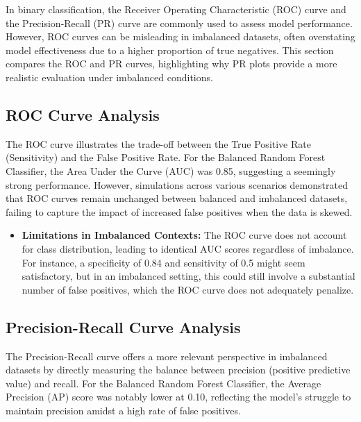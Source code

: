 \documentclass[12pt,a4paper]{report}
\begin{document}
In binary classification, the Receiver Operating Characteristic (ROC) curve and the Precision-Recall (PR) curve are commonly used to assess model performance. However, ROC curves can be misleading in imbalanced datasets, often overstating model effectiveness due to a higher proportion of true negatives. This section compares the ROC and PR curves, highlighting why PR plots provide a more realistic evaluation under imbalanced conditions.

\subsection{ROC Curve Analysis}

The ROC curve illustrates the trade-off between the True Positive Rate (Sensitivity) and the False Positive Rate. For the Balanced Random Forest Classifier, the Area Under the Curve (AUC) was 0.85, suggesting a seemingly strong performance. However, simulations across various scenarios demonstrated that ROC curves remain unchanged between balanced and imbalanced datasets, failing to capture the impact of increased false positives when the data is skewed\citep{classeval2024rocpr}.\\

\begin{itemize}
    \item \textbf{Limitations in Imbalanced Contexts:} The ROC curve does not account for class distribution, leading to identical AUC scores regardless of imbalance. For instance, a specificity of 0.84 and sensitivity of 0.5 might seem satisfactory, but in an imbalanced setting, this could still involve a substantial number of false positives, which the ROC curve does not adequately penalize.
\end{itemize}

\subsection{Precision-Recall Curve Analysis}

The Precision-Recall curve offers a more relevant perspective in imbalanced datasets by directly measuring the balance between precision (positive predictive value) and recall. For the Balanced Random Forest Classifier, the Average Precision (AP) score was notably lower at 0.10, reflecting the model's struggle to maintain precision amidst a high rate of false positives.
\end{document}
